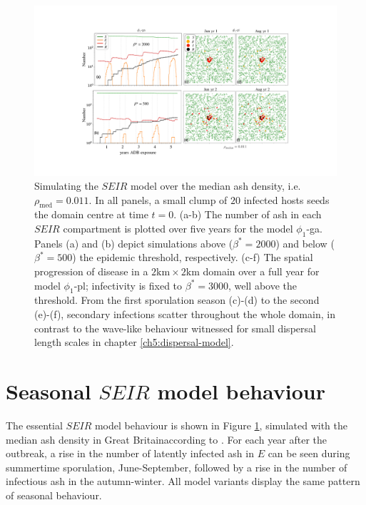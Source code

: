 \begin{landscape}
\begin{figure}
    \centering
    \includegraphics[scale=0.45]{chapter6/figures/fig4-seir.pdf} %
     \caption{Simulating the $SEIR$ model over the median ash density, i.e. $\rho_{\mathrm{med}} = 0.011$. 
     In all panels, a small clump of $20$ infected hosts seeds the domain centre at time $t=0$.
     (a-b) The number of ash in each $SEIR$ compartment is plotted over five years for the model $\phi_1$-ga.
     Panels (a) and (b) depict simulations above ($\beta^*=2000$) and below ($\beta^*=500$) the epidemic threshold, respectively. 
     (c-f) The spatial progression of disease in a $2\mathrm{km} \times 2\mathrm{km}$ domain over a full year for model $\phi_1$-pl; 
     infectivity is fixed to  $\beta^*=3000$, well above the threshold.
     From the first sporulation season (c)-(d) to the second (e)-(f), secondary infections scatter throughout the whole domain, in contrast to the wave-like behaviour witnessed for small dispersal length scales in chapter \ref{ch5:dispersal-model}.}
    \label{fig:SEIR-spread}
\end{figure}
\end{landscape}


\section{Seasonal $SEIR$ model behaviour}
\label{sec:seir-behaviour}

The essential $SEIR$ model behaviour is shown in Figure \ref{fig:SEIR-spread}, simulated with the median ash density in Great Britain\textemdash according to \cite{hill.data}.
For each year after the outbreak, a rise in the number of latently infected ash in $E$ can be seen during summertime sporulation, June-September, followed by a rise in the number of infectious ash in the autumn-winter. 
All model variants display the same pattern of seasonal behaviour. 

